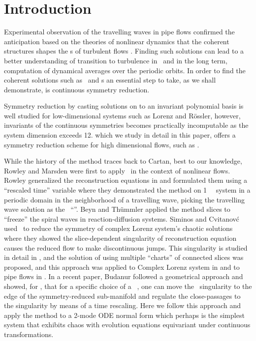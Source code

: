 \section{Introduction}
\label{s:intro}
Experimental observation of the travelling waves in pipe flows  
confirmed the anticipation based on the theories of nonlinear dynamics that 
the coherent structures shapes the \statesp s of turbulent flows . 
Finding such solutions can lead to a better understanding of transition to 
turbulence in \NS\ and in the long term, computation of dynamical averages
over the periodic orbits. In order to find the coherent solutions such as
\reqva\ and \rpo s an essential step to take, as we shall demonstrate, is
continuous symmetry reduction.

Symmetry reduction by casting solutions on to an invariant polynomial basis 
is well studied for low-dimensional systems such as Lorenz 
and R\"{o}ssler, however, invariants of the continuous symmetries becomes 
practically incomputable as the system dimension exceeds 12. 
\Mslices  
{}
which we study in detail in this paper, offers a symmetry reduction scheme
for high dimensional flows, such as \NS .

While the history of the method traces back to Cartan, best  
to our knowledge, Rowley and Marsden were 
first to apply \mslices\ in the context of nonlinear flows. Rowley \etal 
{} generalized the reconstruction equations in 
and formulated them using a ``rescaled time'' variable where they demonstrated 
the method on 1 \dmn\ \KS\ system in a periodic domain in the neighborhood 
of a travelling wave, picking the travelling wave solution as the \slice\ 
``\template ''.  Beyn and Th\"{u}mmler  applied the method 
slices to ``freeze'' the spiral waves in reaction-diffusion systems. Siminos 
and Cvitanov\'{c} \rf{SiCvi10} used \mslices\ to reduce the \SOn{2} symmetry 
of complex Lorenz system's chaotic solutions where they showed the slice-dependent 
singularity of reconstruction equation causes the reduced flow to make discontinuous 
jumps. This singularity is studied in detail in \refref{FrCv11}, and the 
solution of using multiple ``charts'' of connected slices was proposed, 
and this approach was applied to Complex Lorenz system in  
and to pipe flows in \refref{ACHKW11}. In a recent paper, Budanur \etal 
\rf{BudCviDav14} followed a geometrical approach and showed, for \SOn{2}, 
that for a specific choice of a \slice\ \template , one can move the \slice\ 
singularity to the edge of the symmetry-reduced sub-manifold and regulate 
the close-passages to the singularity by means of a time rescaling. Here
we follow this approach and apply the method to a 2-mode  ODE normal
form which perhaps is the simplest system that exhibits chaos with evolution
equations equivariant under continuous \SOn{2} transformations.

